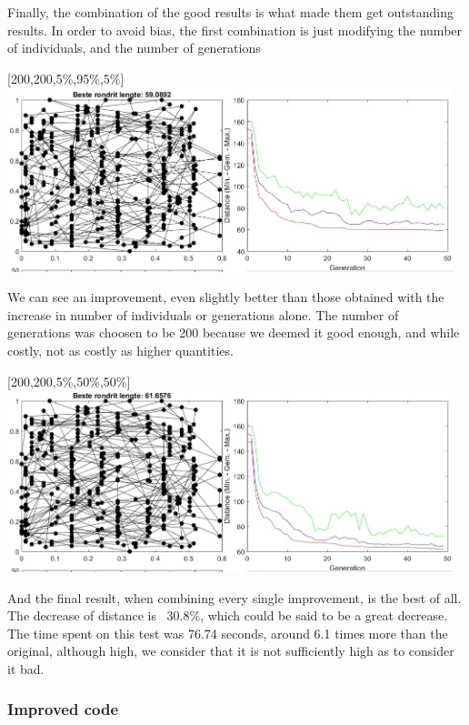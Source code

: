 Finally, the combination of the good results is what made them get
outstanding results. In order to avoid bias, the first combination is just
modifying the number of individuals, and the number of generations\\
\newpage
\begin{center}
[200,200,5\%,95\%,5\%] \\
\includegraphics[width=13cm]{img/specific/xalt_edges/general_6.jpg}
\end{center}
We can see an improvement, even slightly better than those obtained with the
increase in number of individuals or generations alone. The number of
generations was choosen to be 200 because we deemed it good enough, and while
costly, not as costly as higher quantities.
\begin{center}
[200,200,5\%,50\%,50\%] \\
\includegraphics[width=13cm]{img/specific/xalt_edges/general_7.jpg}
\end{center}
And the final result, when combining every single improvement, is the best of
all. The decrease of distance is ~30.8\%, which could be said to be a great
decrease. The time spent on this test was 76.74 seconds, around 6.1 times
more than the original, although high, we consider that it is not
sufficiently high as to consider it bad. \\

\subsubsection{Improved code}

